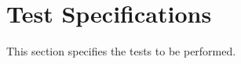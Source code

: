 
\chapter{Test Specifications}
\label{loc:TestSpecifications}


This section specifies the tests to be performed.
\newcommand{\StsTestCaseID}{UndefinedCase}%

\newcommand{\StsTestSpecID}{Test1}%

\renewcommand{\StsTestSpecID}{Test2}%

\DIDINFOON%
